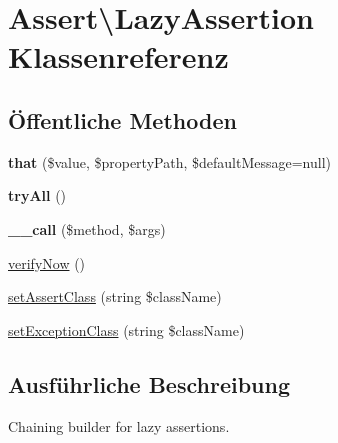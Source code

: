 \hypertarget{class_assert_1_1_lazy_assertion}{}\section{Assert\textbackslash{}Lazy\+Assertion Klassenreferenz}
\label{class_assert_1_1_lazy_assertion}
\subsection*{Öffentliche Methoden}
\begin{DoxyCompactItemize}
\item 
\mbox{\label{class_assert_1_1_lazy_assertion_ad2bd51e4a9f811f2a1932b076edd50dd}} 
{\bfseries that} (\$value, \$property\+Path, \$default\+Message=null)
\item 
\mbox{\label{class_assert_1_1_lazy_assertion_a78b9d93a3333ba67c60783f75149e627}} 
{\bfseries try\+All} ()
\item 
\mbox{\label{class_assert_1_1_lazy_assertion_af2712f129b6eae9d32c47354dc339c42}} 
{\bfseries \+\_\+\+\_\+call} (\$method, \$args)
\item 
\mbox{\hyperlink{class_assert_1_1_lazy_assertion_a7abbdf397bc9d4ba38644993284ad13b}{verify\+Now}} ()
\item 
\mbox{\hyperlink{class_assert_1_1_lazy_assertion_a1bc5f53e1ceee872b466d61ded612cf1}{set\+Assert\+Class}} (string \$class\+Name)
\item 
\mbox{\hyperlink{class_assert_1_1_lazy_assertion_ad7b5feb2726c5b664d555dcf2cfc38e5}{set\+Exception\+Class}} (string \$class\+Name)
\end{DoxyCompactItemize}


\subsection{Ausführliche Beschreibung}
Chaining builder for lazy assertions.

